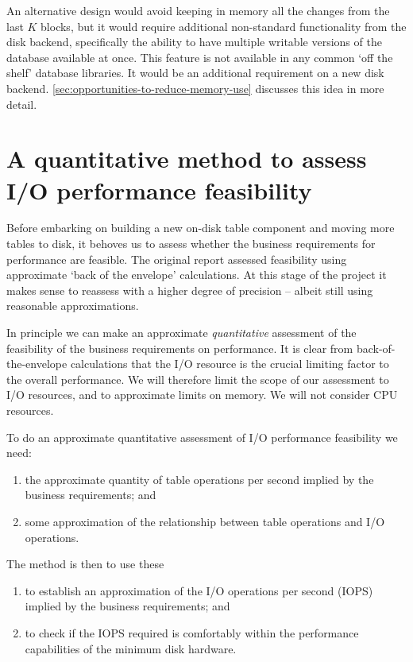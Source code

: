 \documentclass[11pt,a4paper]{article}
\begin{document}
An alternative design would avoid keeping in memory all the changes from the
last $K$ blocks, but it would require additional non-standard functionality from
the disk backend, specifically the ability to have multiple writable versions
of the database available at once. This feature is not available in any common
`off the shelf' database libraries. It would be an additional requirement on
a new disk backend. \cref{sec:opportunities-to-reduce-memory-use} discusses
this idea in more detail.

\section{A quantitative method to assess I/O performance feasibility}
\label{sec:quantitative-method-to-assess-io-performance-feasibility}

Before embarking on building a new on-disk table component and moving more
tables to disk, it behoves us to assess whether the business requirements for
performance are feasible. The original report \citep{utxo-db} assessed
feasibility using approximate `back of the envelope' calculations. At this
stage of the project it makes sense to reassess with a higher degree of
precision -- albeit still using reasonable approximations.

In principle we can make an approximate \emph{quantitative} assessment of the
feasibility of the business requirements on performance. It is clear from
back-of-the-envelope calculations that the I/O resource is the crucial limiting
factor to the overall performance. We will therefore limit the scope of our
assessment to I/O resources, and to approximate limits on memory. We will not
consider CPU resources.

To do an approximate quantitative assessment of I/O performance feasibility we
need:
\begin{enumerate}
\item the approximate quantity of table operations per second implied by the
      business requirements; and
\item some approximation of the relationship between table operations and I/O
      operations.
\end{enumerate}
The method is then to use these
\begin{enumerate}
\item to establish an approximation of the I/O operations per second (IOPS)
      implied by the business requirements; and
\item to check if the IOPS required is comfortably within the performance
      capabilities of the minimum disk hardware.
\end{enumerate}
\end{document}
